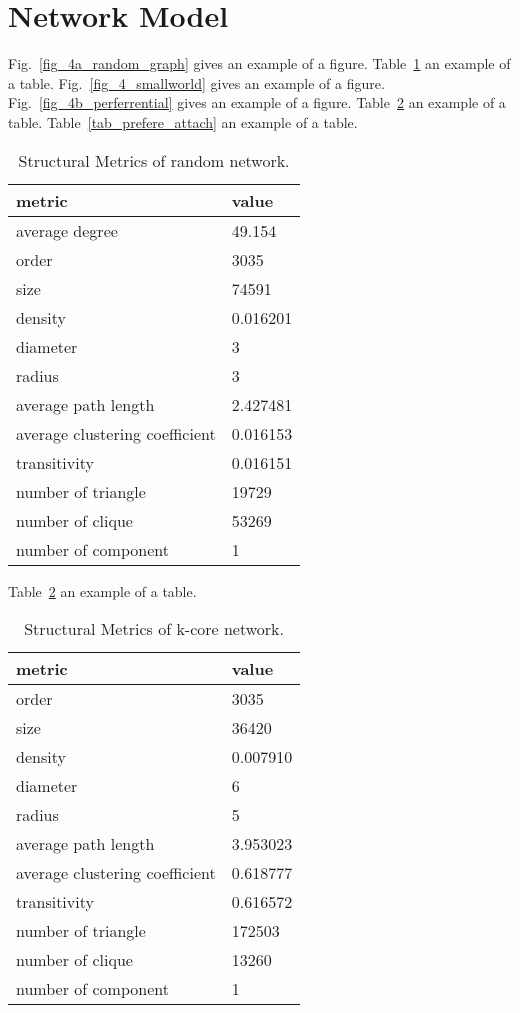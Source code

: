 \documentclass[runningheads]{llncs}
\begin{document}
\section{Network Model}

Fig.~\ref{fig_4a_random_graph} gives an example of a figure.
Table~\ref{tab_random} an example of a table.
Fig.~\ref{fig_4_smallworld} gives an example of a figure.
Fig.~\ref{fig_4b_perferrential} gives an example of a figure.
Table~\ref{tab_smallworld} an example of a table.
Table~\ref{tab_prefere_attach} an example of a table.



\begin{table}
\caption{Structural Metrics of random network.}\label{tab_random}
\begin{tabular}{|l|l|}
\hline
metric & value \\
\hline
average degree & 49.154 \\
order & 3035 \\
size & 74591 \\
density & 0.016201 \\
diameter & 3 \\
radius & 3 \\
average path length & 2.427481 \\
average clustering coefficient & 0.016153 \\
transitivity & 0.016151 \\
number of triangle & 19729 \\
number of clique & 53269 \\
number of component & 1 \\
\hline
\end{tabular}
\end{table}


Table~\ref{tab_smallworld} an example of a table.

\begin{table}
\caption{Structural Metrics of k-core network.}\label{tab_smallworld}
\begin{tabular}{|l|l|}
\hline
metric & value \\
\hline
order & 3035 \\
size & 36420 \\
density & 0.007910 \\
diameter & 6 \\
radius & 5 \\
average path length & 3.953023 \\
average clustering coefficient & 0.618777 \\
transitivity & 0.616572 \\
number of triangle & 172503 \\
number of clique & 13260 \\
number of component & 1 \\
\hline
\end{tabular}
\end{table}
\end{document}
